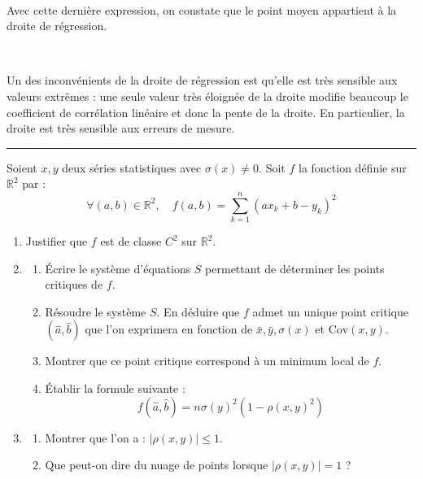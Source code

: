\documentclass[../PolyS4.tex]{subfiles}
\begin{document}
\begin{Rmq}$\,$

Avec cette dernière expression, on constate que le point moyen appartient à la droite de régression.
\end{Rmq}

\begin{Rmq}$\,$

Un des inconvénients de la droite de régression est qu'elle est très sensible aux valeurs extrêmes : une seule valeur très éloignée de la droite modifie beaucoup le coefficient de corrélation linéaire et donc la pente de la droite. En particulier, la droite est très sensible aux erreurs de mesure.
\end{Rmq}

\vspace{1em}
\hrule
\vspace{1em}


Soient $x, y$ deux séries statistiques avec $\sigma(x) \neq 0$. Soit $f$ la fonction définie sur $\mathbb{R}^2$ par :
\[
\forall (a, b) \in \mathbb{R}^2, \quad f(a, b) = \sum_{k=1}^{n} (ax_k + b - y_k)^2
\]

\begin{enumerate}
    \item Justifier que $f$ est de classe $C^2$ sur $\mathbb{R}^2$.
    \item 
    \begin{enumerate}
        \item Écrire le système d'équations $S$ permettant de déterminer les points critiques de $f$.
        \item Résoudre le système $S$. En déduire que $f$ admet un unique point critique $(\hat{a}, \hat{b})$ que l'on exprimera en fonction de $\bar{x}, \bar{y}, \sigma(x)$ et $\text{Cov}(x, y)$.
        \item Montrer que ce point critique correspond à un minimum local de $f$.
        \item Établir la formule suivante :
        \[
        f(\hat{a}, \hat{b}) = n\sigma(y)^2 (1 - \rho(x, y)^2)
        \]
    \end{enumerate}
    \item 
    \begin{enumerate}
        \item Montrer que l'on a : $|\rho(x, y)| \leq 1$.
        \item Que peut-on dire du nuage de points lorsque $|\rho(x, y)| = 1$ ?
    \end{enumerate}
\end{enumerate}
\end{document}
